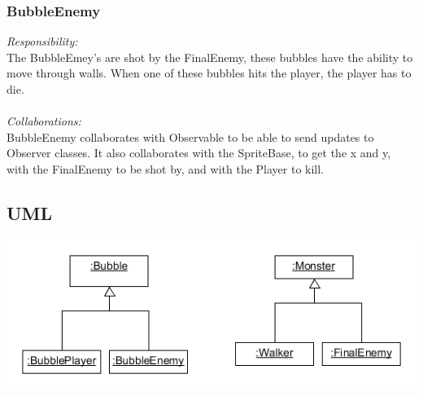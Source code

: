 \subsubsection{BubbleEnemy}
\textit{Responsibility:} \\
The BubbleEmey's are shot by the FinalEnemy, these bubbles have the ability to move through walls. When one of these bubbles hits the player, the player has to die. \\ \\
\textit{Collaborations:} \\
BubbleEnemy collaborates with Observable to be able to send updates to Observer classes. It also collaborates with  the SpriteBase, to get the x and y, with the FinalEnemy to be shot by, and with the Player to kill.

\subsection{UML}
\includegraphics[width=150mm]{FinalEnemyUml.png}